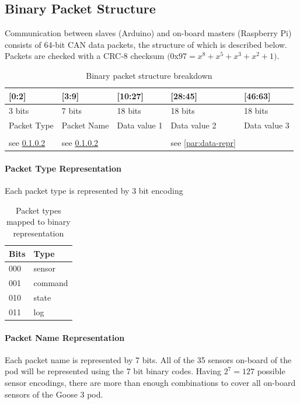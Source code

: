     \subsection{Binary Packet Structure}
    Communication between slaves (Arduino) and on-board masters (Raspberry Pi) consists of 64-bit CAN data packets, the structure of which is described below. Packets are checked with a CRC-8 checksum $(0$x$97 = x^8 + x^5 + x^3 + x^2 + 1)$.
    \begin{table}[H]
        \centering
        \begin{tabulary}{\textwidth}{@{}LLlll@{}} \toprule
            {[0:2]} & {[3:9]} & {[10:27]} & {[28:45]} & {[46:63]}\\  bits & 7 bits & 18 bits & 18 bits & 18 bits\\
            Packet Type & Packet Name & Data value 1 & Data value 2 & Data value 3\\ 
            \\
            see \ref{par:packet-name-repr} & see \ref{par:packet-name-repr} & & see \ref{par:data-repr} \\ \bottomrule
        \end{tabulary}
        \caption{Binary packet structure breakdown}
    \end{table}
    \paragraph{Packet Type Representation}
    \label{par:packet-type-repr}
    Each packet type is represented by 3 bit encoding
    \begin{table}[H]
        \centering
        \begin{tabular}{@{}ll@{}} \toprule
            Bits & Type\\ \midrule
            000 & sensor\\
            001 & command\\
            010 & state\\
            011 & log\\ \bottomrule
        \end{tabular}
        \caption{Packet types mapped to binary representation}
    \end{table}

    \paragraph{Packet Name Representation}
    \label{par:packet-name-repr}
    Each packet name is represented by 7 bits. All of the 35 sensors on-board of the pod will be represented using the 7 bit binary codes. Having $2^7=127$ possible sensor encodings, there are more than enough combinations to cover all on-board sensors of the Goose 3 pod.

